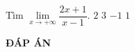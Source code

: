 \begin{ex}	%
	Tìm $\lim\limits_{x \to +\infty}\dfrac{2x+1}{x-1}$.
	\choice
	{\True $2$}
	{$3$}
	{$-1$}
	{$1$}
\end{ex}
\newpage
\begin{center}
	\textbf{ĐÁP ÁN}
\end{center}
\begin{multicols}{10}
	 
\end{multicols}
